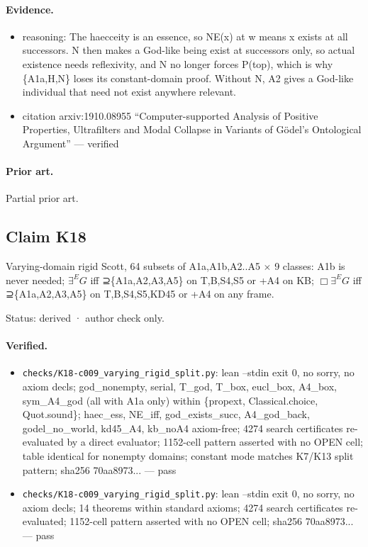 \documentclass{article}
\begin{document}
\paragraph{Evidence.}
\begin{itemize}
\item reasoning: The haecceity is an essence, so NE(x) at w means x exists at all successors. N then makes a God-like being exist at successors only, so actual existence needs reflexivity, and N no longer forces P(top), which is why \{A1a,H,N\} loses its constant-domain proof. Without N, A2 gives a God-like individual that need not exist anywhere relevant.
\item citation arxiv:1910.08955 “Computer-supported Analysis of Positive Properties, Ultrafilters and Modal Collapse in Variants of Gödel’s Ontological Argument” --- verified
\end{itemize}

\paragraph{Prior art.} Partial prior art.

\subsection*{Claim K18}

Varying-domain rigid Scott, 64 subsets of A1a,A1b,A2..A5 $\times$ 9 classes: A1b is never needed; $\exists^E G$ iff ⊇\{A1a,A2,A3,A5\} on T,B,S4,S5 or +A4 on KB; $\Box\exists^E G$ iff ⊇\{A1a,A2,A3,A5\} on T,B,S4,S5,KD45 or +A4 on any frame.

Status: derived · author check only.

\paragraph{Verified.}
\begin{itemize}
\item \texttt{checks/K18-c009\_varying\_rigid\_split.py}: lean --stdin exit 0, no sorry, no axiom decls; god\_nonempty, serial, T\_god, T\_box, eucl\_box, A4\_box, sym\_A4\_god (all with A1a only) within \{propext, Classical.choice, Quot.sound\}; haec\_ess, NE\_iff, god\_exists\_succ, A4\_god\_back, godel\_no\_world, kd45\_A4, kb\_noA4 axiom-free; 4274 search certificates re-evaluated by a direct evaluator; 1152-cell pattern asserted with no OPEN cell; table identical for nonempty domains; constant mode matches K7/K13 split pattern; sha256 70aa8973... --- pass
\item \texttt{checks/K18-c009\_varying\_rigid\_split.py}: lean --stdin exit 0, no sorry, no axiom decls; 14 theorems within standard axioms; 4274 search certificates re-evaluated; 1152-cell pattern asserted with no OPEN cell; sha256 70aa8973... --- pass
\end{itemize}
\end{document}
